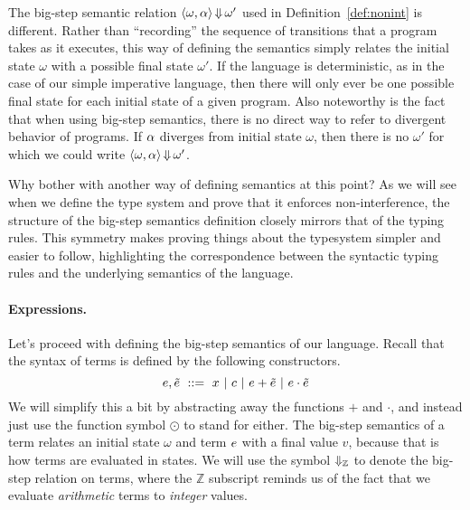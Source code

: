 \documentclass[11pt,twoside]{scrartcl}
\begin{document}
The big-step semantic relation $\langle \omega, \alpha\rangle \operatorname{\Downarrow} \omega'$ used in Definition~\ref{def:nonint} is different. Rather than ``recording'' the sequence of transitions that a program takes as it executes, this way of defining the semantics simply relates the initial state $\omega$ with a possible final state $\omega'$. If the language is deterministic, as in the case of our simple imperative language, then there will only ever be one possible final state for each initial state of a given program. Also noteworthy is the fact that when using big-step semantics, there is no direct way to refer to divergent behavior of programs. If $\alpha$ diverges from initial state $\omega$, then there is no $\omega'$ for which we could write $\langle \omega, \alpha\rangle \operatorname{\Downarrow} \omega'$.

Why bother with another way of defining semantics at this point? As we will see when we define the type system and prove that it enforces non-interference, the structure of the big-step semantics definition closely mirrors that of the typing rules. This symmetry makes proving things about the typesystem simpler and easier to follow, highlighting the correspondence between the syntactic typing rules and the underlying semantics of the language.

\paragraph{Expressions.} Let's proceed with defining the big-step semantics of our language. Recall that the syntax of terms is defined by the following constructors.
\[
  e,\tilde{e} ~\mathrel{::=}~
  x
  ~|~
  c
  ~|~
  e+\tilde{e}
  ~|~
  e\cdot\tilde{e}
\]
We will simplify this a bit by abstracting away the functions $+$ and $\cdot$, and instead just use the function symbol $\odot$ to stand for either. The big-step semantics of a term relates an initial state $\omega$ and term $e$ with a final value $v$, because that is how terms are evaluated in states. We will use the symbol $\operatorname{\Downarrow_{\mathbb{Z}}}$ to denote the big-step relation on terms, where the $\mathbb{Z}$ subscript reminds us of the fact that we evaluate \emph{arithmetic} terms to \emph{integer} values.
\end{document}
